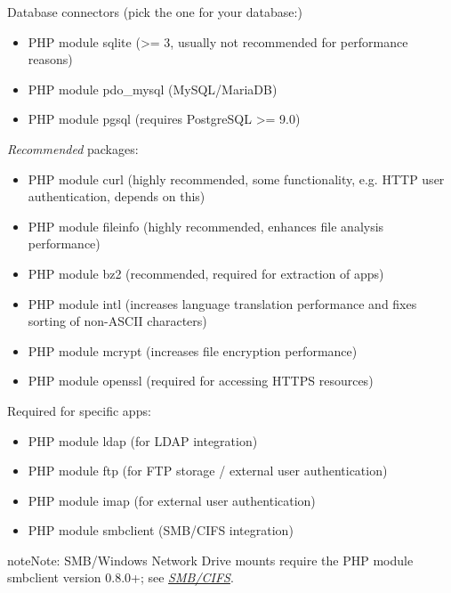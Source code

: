 \documentclass[letterpaper,10pt,english]{sphinxmanual}
\begin{document}
Database connectors (pick the one for your database:)
\begin{itemize}
\item {} 
PHP module sqlite (\textgreater{}= 3, usually not recommended for performance reasons)

\item {} 
PHP module pdo\_mysql (MySQL/MariaDB)

\item {} 
PHP module pgsql (requires PostgreSQL \textgreater{}= 9.0)

\end{itemize}

\emph{Recommended} packages:
\begin{itemize}
\item {} 
PHP module curl (highly recommended, some functionality, e.g. HTTP user
authentication, depends on this)

\item {} 
PHP module fileinfo (highly recommended, enhances file analysis performance)

\item {} 
PHP module bz2 (recommended, required for extraction of apps)

\item {} 
PHP module intl (increases language translation performance and fixes sorting
of non-ASCII characters)

\item {} 
PHP module mcrypt (increases file encryption performance)

\item {} 
PHP module openssl (required for accessing HTTPS resources)

\end{itemize}

Required for specific apps:
\begin{itemize}
\item {} 
PHP module ldap (for LDAP integration)

\item {} 
PHP module ftp (for FTP storage / external user authentication)

\item {} 
PHP module imap (for external user authentication)

\item {} 
PHP module smbclient  (SMB/CIFS integration)

\end{itemize}

\begin{notice}{note}{Note:}
SMB/Windows Network Drive mounts require the PHP module smbclient version 0.8.0+; see
{\hyperref[configuration_files/external_storage/smb::doc]{\emph{SMB/CIFS}}}.
\end{notice}
\end{document}
